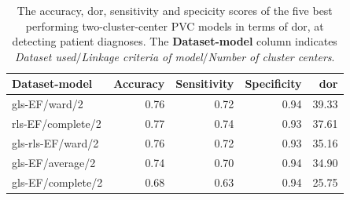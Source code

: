 \begin{table}
    \centering
    \begin{tabular}{lrrrr}
        \toprule
        Dataset-model    &  Accuracy &  Sensitivity &  Specificity &   \acrshort{dor} \\
        \midrule
        gls-EF/ward/2     &      0.76 &         0.72 &         0.94 & 39.33 \\
        rls-EF/complete/2 &      0.77 &         0.74 &         0.93 & 37.61 \\
        gls-rls-EF/ward/2 &      0.76 &         0.72 &         0.93 & 35.16 \\
        gls-EF/average/2  &      0.74 &         0.70 &         0.94 & 34.90 \\
        gls-EF/complete/2 &      0.68 &         0.63 &         0.94 & 25.75 \\
        \bottomrule
    \end{tabular}
    \caption{The accuracy, \acrshort{dor}, sensitivity and specicity scores of the five best performing two-cluster-center PVC models in terms of \acrshort{dor}, at detecting patient diagnoses.
             The \textbf{Dataset-model} column indicates \textit{Dataset used}$/$\textit{Linkage criteria of model}$/$\textit{Number of cluster centers}.}
    \label{tab:pvc_ind_dor_sens_spec_dist}
\end{table}

